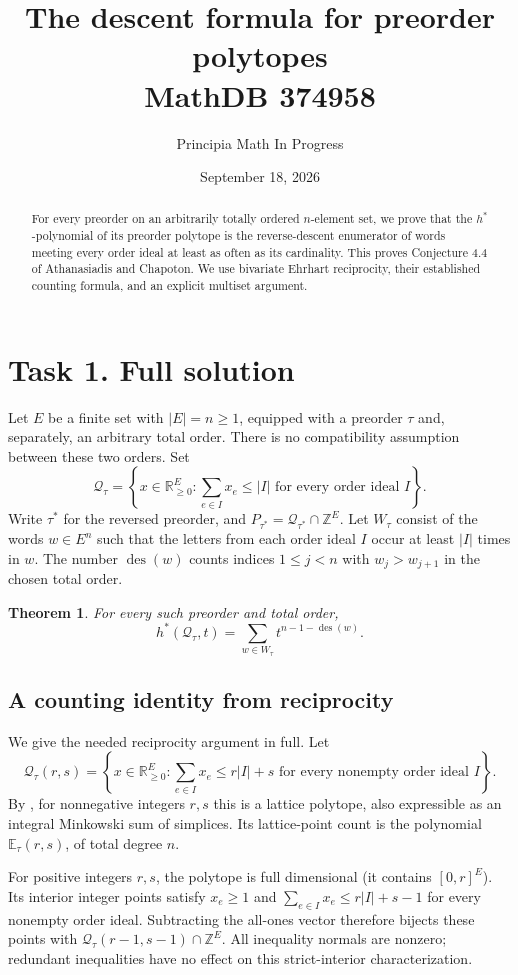 \documentclass[11pt]{article}
\title{The descent formula for preorder polytopes\\\large MathDB 374958}
\author{Principia Math In Progress}
\date{September 18, 2026}
\newtheorem{theorem}{Theorem}
\newcommand{\E}{\mathbb E}
\newcommand{\Q}{\mathcal Q}
\newcommand{\des}{\operatorname{des}}
\begin{document}
\maketitle
\begin{abstract}
For every preorder on an arbitrarily totally ordered $n$-element set,
we prove that the $h^*$-polynomial of its preorder polytope is the
reverse-descent enumerator of words meeting every order ideal at
least as often as its cardinality. This proves Conjecture 4.4 of
Athanasiadis and Chapoton. We use bivariate Ehrhart reciprocity,
their established counting formula, and an explicit multiset argument.
\end{abstract}

\section*{Task 1. Full solution}
Let $E$ be a finite set with $|E|=n\ge1$, equipped with a preorder
$\tau$ and, separately, an arbitrary total order. There is no
compatibility assumption between these two orders. Set
\[
 \Q_\tau=\left\{x\in\mathbb R_{\ge0}^E:
       \sum_{e\in I}x_e\le |I|\text{ for every order ideal }I\right\}.
\]
Write $\tau^*$ for the reversed preorder, and
$P_{\tau^*}=\Q_{\tau^*}\cap\mathbb Z^E$.
Let $W_\tau$ consist of the words $w\in E^n$ such that the letters
from each order ideal $I$ occur at least $|I|$ times in $w$.
The number $\des(w)$ counts indices $1\le j<n$ with $w_j>w_{j+1}$
in the chosen total order.

\begin{theorem}\label{thm:main}
For every such preorder and total order,
\[
 \boxed{h^*(\Q_\tau,t)=\sum_{w\in W_\tau}t^{n-1-\des(w)}.}
\]
\end{theorem}

\subsection*{A counting identity from reciprocity}
We give the needed reciprocity argument in full. Let
\[
 \Q_\tau(r,s)=\left\{x\in\mathbb R_{\ge0}^E:
       \sum_{e\in I}x_e\le r|I|+s
       \text{ for every nonempty order ideal }I\right\}.
\]
By \cite[Propositions 3.2--3.3 and 7.1]{AC}, for nonnegative
integers $r,s$ this is a lattice polytope, also expressible as an
integral Minkowski sum of simplices. Its lattice-point count is the
polynomial $\E_\tau(r,s)$, of total degree $n$.

For positive integers $r,s$, the polytope is full dimensional
(it contains $[0,r]^E$). Its interior integer points satisfy
$x_e\ge1$ and $\sum_{e\in I}x_e\le r|I|+s-1$ for every
nonempty order ideal. Subtracting the all-ones vector therefore
bijects these points with $\Q_\tau(r-1,s-1)\cap\mathbb Z^E$.
All inequality normals are nonzero; redundant inequalities have
no effect on this strict-interior characterization.
\end{document}
